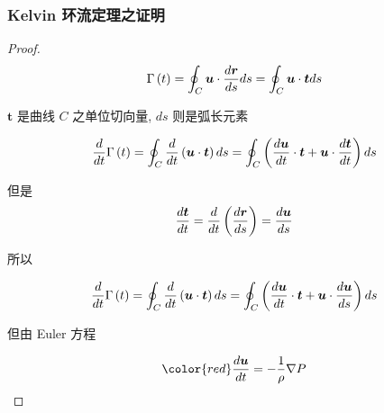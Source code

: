 \documentclass[aspectratio=2516]{beamer}
\begin{document}

\begin{frame}
\frametitle{ \kaishu Kelvin 环流定理之证明}

\kaishu

\vspace{-0.25cm}

\begin{proof}
	
	\kaishu
	
	\tiny 
	
	\begin{equation}
	\Gamma \left( t \right) = \oint_C {\boldsymbol{u} \cdot \frac{{d\boldsymbol{r}}}{{ds}}ds}  = \oint_C {\boldsymbol{u} \cdot \boldsymbol{t}ds}
	\notag 
	\end{equation}
	
	$ \boldsymbol{t} $ 是曲线 $ C $ 之单位切向量, $ ds  $ 则是弧长元素
	
	\begin{equation}
	\frac{d}{{dt}}\Gamma \left( t \right) = \oint_C {\frac{d}{{dt}}\left( {\boldsymbol{u} \cdot \boldsymbol{t}} \right)ds}  = \oint_C {\left( {\frac{{d\boldsymbol{u}}}{{dt}} \cdot \boldsymbol{t} + \boldsymbol{u} \cdot \frac{{d\boldsymbol{t}}}{{dt}}} \right)ds} 
	\notag 
	\end{equation}
	
	但是
	\begin{equation}
	\frac{{d\boldsymbol{t}}}{{dt}} = \frac{d}{{dt}}\left( {\frac{{d\boldsymbol{r}}}{{ds}}} \right) = \frac{{d\boldsymbol{u}}}{{ds}}
	\notag 
	\end{equation}
	
	所以
	
	\begin{equation}
	\frac{d}{{dt}}\Gamma \left( t \right) = \oint_C {\frac{d}{{dt}}\left( {\boldsymbol{u} \cdot \boldsymbol{t}} \right)ds}  = \oint_C {\left( {\frac{{d\boldsymbol{u}}}{{dt}} \cdot \boldsymbol{t} + \boldsymbol{u} \cdot \frac{{d\boldsymbol{u}}}{{ds}}} \right)ds} 
	\notag
	\end{equation}
	
	但由 Euler 方程
	
	\begin{equation}
	\color{red}
	\frac{{d\boldsymbol{u}}}{{dt}} =  - \frac{1}{\rho }\nabla P
	\notag 
	\end{equation}
	
\end{proof}

\end{frame}
\end{document}
